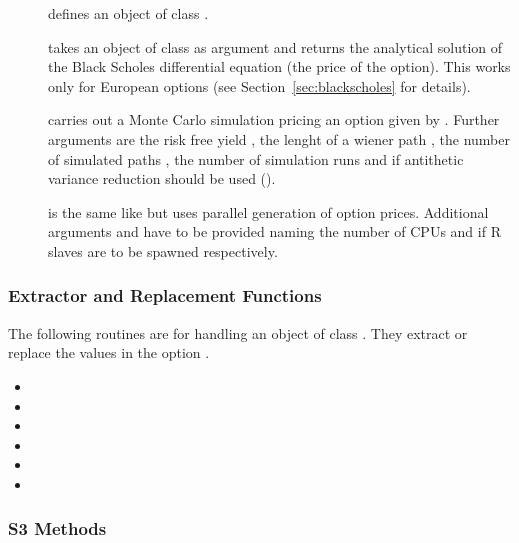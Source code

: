 \begin{description}
\item[] defines an object
  of class . 
\item[] takes an object of class
   as argument and returns the analytical solution of
  the Black Scholes differential equation (the price of the
  option). This works only for European options (see
  Section~\ref{sec:blackscholes} for details).
\item[] carries out a Monte Carlo simulation pricing
  an option given by . Further arguments are the risk free
  yield , the lenght of a wiener path , the number of
  simulated paths , the number of simulation runs
   and if antithetic variance reduction should be
  used ().
\item[] is the same
  like  but uses parallel generation of
  option prices. Additional arguments  and
   have to be provided naming the number of CPUs
  and if R slaves are to be spawned respectively.
\end{description}

\subsubsection{Extractor and Replacement Functions}

The following routines are for handling an object of class
. They
extract or replace the values in the option .

\begin{itemize}
\item {}
\item {}
\item {}
\item {}
\item {}
\item {}
\end{itemize}

\subsubsection{S3 Methods}

